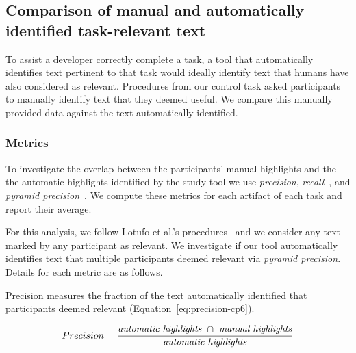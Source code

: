
\subsection{Comparison of manual and automatically identified task-relevant text}
\label{cp6:comparison}


To assist a developer correctly complete a task, a tool that
automatically identifies text pertinent to that task would ideally 
identify text that humans have also considered as relevant.
Procedures from our control task asked participants to 
manually identify text that they deemed useful. We
 compare this manually provided data against the text automatically identified.




\subsubsection{Metrics}

To investigate the overlap between the participants' manual highlights and the 
the automatic highlights identified by the study tool we use \textit{precision}, \textit{recall}~\cite{manning2010IR}, and \textit{pyramid precision}~\cite{Nenkova2004}.
We compute these metrics for each artifact of each task and report their average.


For this analysis, we follow Lotufo et al.'s procedures~\cite{Lotufo2012} and we consider any text marked by any participant as relevant.
We investigate if our tool  automatically identifies text that multiple participants deemed relevant
 via \textit{pyramid precision}. 
Details for each metric are as follows. 

\medskip

Precision measures the fraction of the text automatically identified  that participants deemed relevant (Equation~\ref{eq:precision-cp6}). 

\smallskip
\begin{small}
\begin{equation}
    Precision = \frac{
        \text{\textit{automatic highlights}~} \cap 
        \text{~\textit{manual highlights}}
    }{\text{\textit{automatic highlights}}}
\label{eq:precision-cp6}    
\end{equation}
\end{small}


